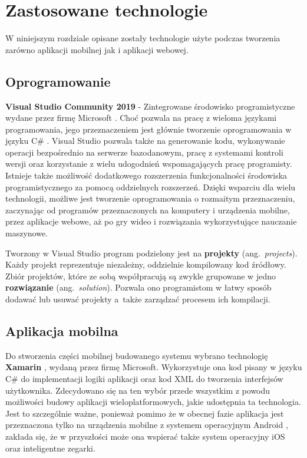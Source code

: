\chapter{Zastosowane technologie}\label{chap:zastosowane-technologie}
W niniejszym rozdziale opisane zostały technologie użyte podczas tworzenia zarówno aplikacji mobilnej jak i aplikacji webowej.
\section{Oprogramowanie}
\textbf{Visual Studio Community 2019}\cite{visual-studio} - Zintegrowane środowisko programistyczne wydane przez firmę Microsoft \cite{microsoft}. Choć pozwala na pracę z wieloma językami programowania, jego przeznaczeniem jest głównie tworzenie oprogramowania w języku C\# \cite{csharp}. Visual Studio pozwala także na generowanie kodu, wykonywanie operacji bezpośrednio na serwerze bazodanowym, pracę z systemami kontroli wersji oraz korzystanie z wielu udogodnień wspomagających pracę programisty. Istnieje także możliwość dodatkowego rozszerzenia funkcjonalności środowiska programistycznego za pomocą oddzielnych rozszerzeń. Dzięki wsparciu dla wielu technologii, możliwe jest tworzenie oprogramowania o rozmaitym przeznaczeniu, zaczynając od programów przeznaczonych na komputery i urządzenia mobilne, przez aplikacje webowe, aż po gry wideo i rozwiązania wykorzystujące nauczanie maszynowe.

Tworzony w Visual Studio program podzielony jest na \textbf{projekty} (ang.~\textit{projects}). Każdy projekt reprezentuje niezależny, oddzielnie kompilowany kod źródłowy. Zbiór projektów, które ze sobą współpracują są zwykle grupowane w jedno \textbf{rozwiązanie} (ang.~\textit{solution}). Pozwala ono programistom w łatwy sposób dodawać lub usuwać projekty a~także zarządzać procesem ich kompilacji.

\section{Aplikacja mobilna}
Do stworzenia części mobilnej budowanego systemu wybrano technologię \textbf{Xamarin} \cite{xamarin_docs}, wydaną przez firmę Microsoft. Wykorzystuje ona kod pisany w języku C\# do implementacji logiki aplikacji oraz kod XML \cite{xml} do tworzenia interfejsów użytkownika. Zdecydowano się na ten wybór przede wszystkim z powodu możliwości budowy aplikacji wieloplatformowych, jakie udostępnia ta technologia. Jest to szczególnie ważne, ponieważ pomimo że w obecnej fazie aplikacja jest przeznaczona tylko na urządzenia mobilne z systemem operacyjnym Android \cite{android}, zakłada się, że w przyszłości może ona wspierać także system operacyjny iOS \cite{ios} oraz inteligentne zegarki.

